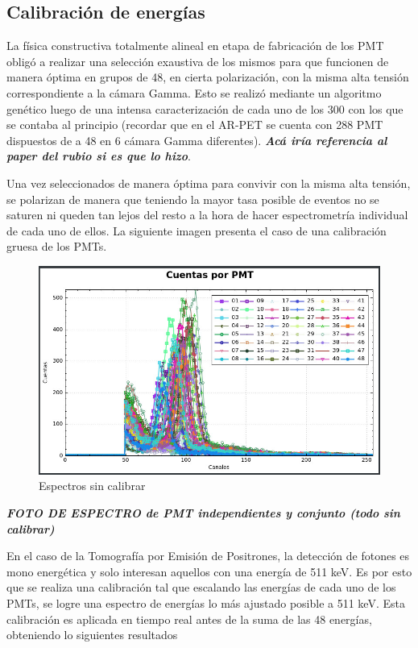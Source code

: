 \documentclass[conference]{IEEEtran}
\begin{document}
\subsection{Calibración de energías}

La física constructiva totalmente alineal en etapa de fabricación de los PMT obligó a realizar una selección exaustiva de los mismos para que funcionen de manera óptima en grupos de 48, en cierta polarización, con la misma alta tensión correspondiente a la cámara Gamma. Esto se realizó mediante un algoritmo genético luego de una intensa caracterización de cada uno de los 300 con los que se contaba al principio (recordar que en el AR-PET se cuenta con 288 PMT dispuestos de a 48 en 6 cámara Gamma diferentes). \textit{\textbf{Acá iría referencia al paper del rubio si es que lo hizo}}.

Una vez seleccionados de manera óptima para convivir con la misma alta tensión, se polarizan de manera que teniendo la mayor tasa posible de eventos no se saturen ni queden tan lejos del resto a la hora de hacer espectrometría individual de cada uno de ellos. La siguiente imagen presenta el caso de una calibración gruesa de los PMTs.

\begin{figure}[h]
\centering
\includegraphics[scale=0.2]{Espectro_Sin_Calibrar.jpeg}
\caption{Espectros sin calibrar}
\label{fig:Espectros sin calibrar}
\end{figure}

\textbf{\textit{FOTO DE ESPECTRO de PMT independientes y conjunto (todo sin calibrar)}}

En el caso de la Tomografía por Emisión de Positrones, la detección de fotones es mono energética y solo interesan aquellos con una energía de 511 keV. Es por esto que se realiza una calibración tal que escalando las energías de cada uno de los PMTs, se logre una espectro de energías lo más ajustado posible a 511 keV. Esta calibración es aplicada en tiempo real antes de la suma de las 48 energías, obteniendo lo siguientes resultados
\end{document}
